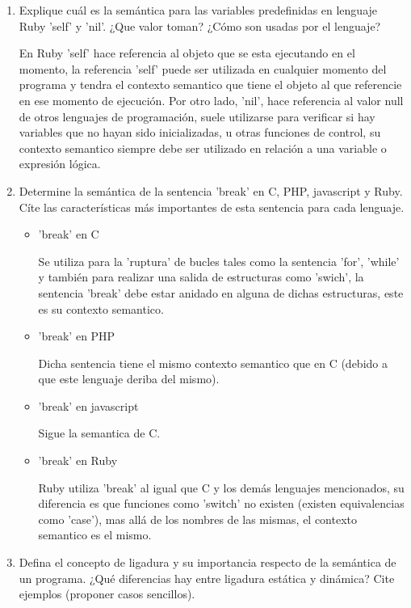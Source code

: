 \documentclass[a4paper,10pt]{article}
\begin{document}
\begin{enumerate}
\item Explique cuál es la semántica para las variables predefinidas en lenguaje Ruby 'self' y 'nil'. ¿Que valor toman? ¿Cómo son usadas por el lenguaje?

En Ruby 'self' hace referencia al objeto que se esta ejecutando en el momento, la referencia 'self' puede ser utilizada en cualquier momento del programa y tendra el contexto semantico que tiene el objeto al que referencie en ese momento de ejecución. Por otro lado, 'nil', hace referencia al valor null de otros lenguajes de programación, suele utilizarse para verificar si hay variables que no hayan sido inicializadas, u otras funciones de control, su contexto semantico siempre debe ser utilizado en relación a una variable o expresión lógica.

\item Determine la semántica de la sentencia 'break' en C, PHP, javascript y Ruby. Cíte las características más importantes de esta sentencia para cada lenguaje.

\begin{itemize}
\item 'break' en C

Se utiliza para la 'ruptura' de bucles tales como la sentencia 'for', 'while' y también para realizar una salida de estructuras como 'swich', la sentencia 'break' debe estar anidado en alguna de dichas estructuras, este es su contexto semantico.

\item 'break' en PHP

Dicha sentencia tiene el mismo contexto semantico que en C (debido a que este lenguaje deriba del mismo).

\item 'break' en javascript

Sigue la semantica de C.

\item 'break' en Ruby

Ruby utiliza 'break' al igual que C y los demás lenguajes mencionados, su diferencia es que funciones como 'switch' no existen (existen equivalencias como 'case'), mas allá de los nombres de las mismas, el contexto semantico es el mismo.

\end{itemize}

\item Defina el concepto de ligadura y su importancia respecto de la semántica de un programa. ¿Qué diferencias hay entre ligadura estática y dinámica? Cite ejemplos (proponer casos sencillos).


\end{enumerate}
\end{document}
